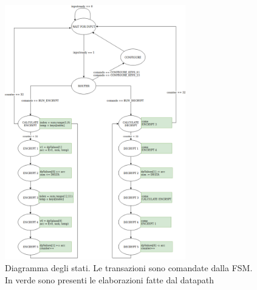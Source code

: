 \begin{figure}[htbp]
    \centering
    \includegraphics[width=0.7\textwidth]{schemi/rtl_efsm.png}
    \caption{Diagramma degli stati. Le transazioni sono comandate dalla FSM. In verde sono presenti le elaborazioni fatte dal datapath}
    \label{fig:efsm}
\end{figure}